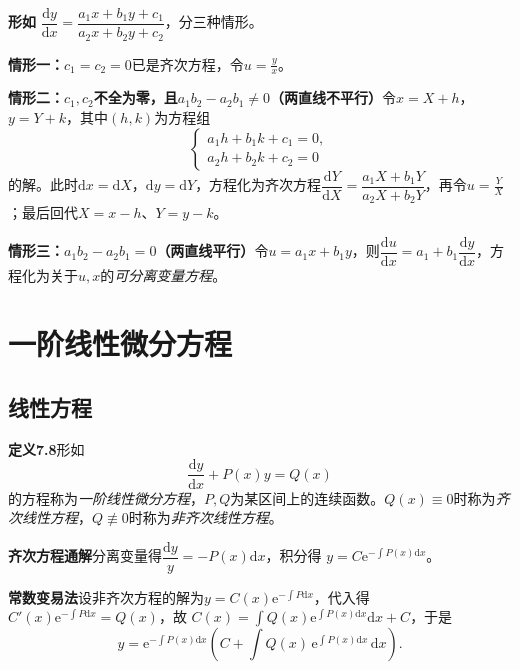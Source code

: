 \noindent\textbf{形如}\quad
$\dfrac{\mathrm{d}y}{\mathrm{d}x}=\dfrac{a_1x+b_1y+c_1}{a_2x+b_2y+c_2}$，分三种情形。

\noindent\textbf{情形一：$c_1=c_2=0$}\quad 已是齐次方程，令$u=\frac{y}{x}$。

\noindent\textbf{情形二：$c_1,c_2$不全为零，且$a_1b_2-a_2b_1\neq0$（两直线不平行）}\quad 令$x=X+h$，$y=Y+k$，其中$(h,k)$为方程组
\[
\begin{cases}a_1h+b_1k+c_1=0,\\ a_2h+b_2k+c_2=0\end{cases}
\]
的解。此时$\mathrm{d}x=\mathrm{d}X$，$\mathrm{d}y=\mathrm{d}Y$，方程化为齐次方程$\dfrac{\mathrm{d}Y}{\mathrm{d}X}=\dfrac{a_1X+b_1Y}{a_2X+b_2Y}$，再令$u=\frac{Y}{X}$；最后回代$X=x-h$、$Y=y-k$。

\noindent\textbf{情形三：$a_1b_2-a_2b_1=0$（两直线平行）}\quad 令$u=a_1x+b_1y$，则$\dfrac{\mathrm{d}u}{\mathrm{d}x}=a_1+b_1\dfrac{\mathrm{d}y}{\mathrm{d}x}$，方程化为关于$u,x$的\emph{可分离变量方程}。


\section{一阶线性微分方程}

\subsection{线性方程}

\noindent\textbf{定义7.8}\quad 形如
\[
\frac{\mathrm{d}y}{\mathrm{d}x}+P(x)y=Q(x)
\]
的方程称为\emph{一阶线性微分方程}，$P,Q$为某区间上的连续函数。$Q(x)\equiv0$时称为\emph{齐次线性方程}，$Q\not\equiv0$时称为\emph{非齐次线性方程}。

\noindent\textbf{齐次方程通解}\quad 分离变量得$\dfrac{\mathrm{d}y}{y}=-P(x)\mathrm{d}x$，积分得
$y=C\mathrm{e}^{-\int P(x)\mathrm{d}x}$。

\noindent\textbf{常数变易法}\quad 设非齐次方程的解为$y=C(x)\mathrm{e}^{-\int P\mathrm{d}x}$，代入得$C'(x)\mathrm{e}^{-\int P\mathrm{d}x}=Q(x)$，故
$C(x)=\displaystyle\int Q(x)\mathrm{e}^{\int P(x)\mathrm{d}x}\mathrm{d}x+C$，于是
\[
y=\mathrm{e}^{-\int P(x)\mathrm{d}x}\left(C+\int Q(x)\,\mathrm{e}^{\int P(x)\mathrm{d}x}\,\mathrm{d}x\right).
\]


